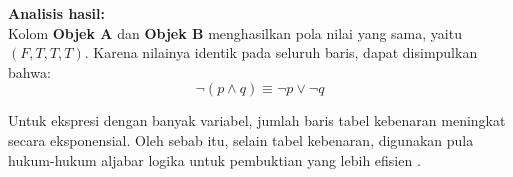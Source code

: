 \textbf{Analisis hasil:} \\
Kolom \textbf{Objek A} dan \textbf{Objek B} menghasilkan pola nilai yang sama, yaitu $(F, T, T, T)$. Karena nilainya identik pada seluruh baris, dapat disimpulkan bahwa:
\[
\neg(p \wedge q) \equiv \neg p \vee \neg q
\]

Untuk ekspresi dengan banyak variabel, jumlah baris tabel kebenaran meningkat secara eksponensial. Oleh sebab itu, selain tabel kebenaran, digunakan pula hukum-hukum aljabar logika untuk pembuktian yang lebih efisien \cite{wiki_proplogic}.
